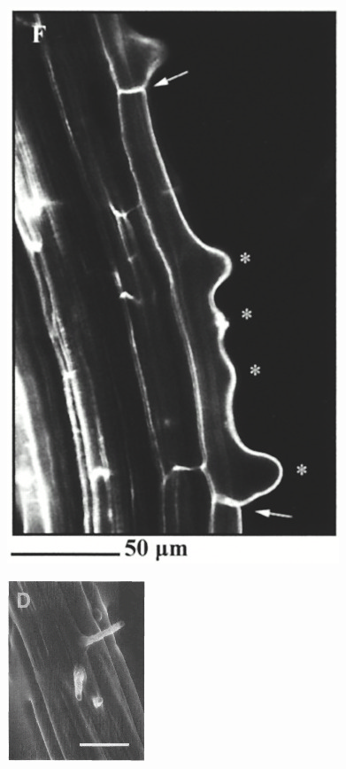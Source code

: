 \begin{figure}[t!]
\centering
\begin{minipage}{3.3cm}
    \centering
    \includegraphics[height=0.28\textheight]{fig01/Nswellings}\label{sf:multiRH02a}
\end{minipage}
\hspace{0.5cm}
\begin{minipage}{3.3cm}
    \centering
    \includegraphics[height=0.27\textheight]{fig01/Mswellings}\label{sf:multiRH02b}
\end{minipage}

\end{figure}
